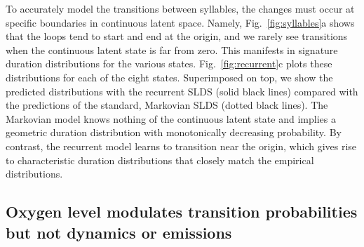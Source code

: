 \documentclass[11pt]{article}
\begin{document}
To accurately model the transitions between syllables, the changes
must occur at specific boundaries in continuous latent space.  Namely,
Fig.~\ref{fig:syllables}a shows that the loops tend to start and end
at the origin, and we rarely see transitions when the continuous
latent state is far from zero. This manifests in signature duration
distributions for the various states.  Fig.~\ref{fig:recurrent}c plots
these distributions for each of the eight states.  Superimposed on
top, we show the predicted distributions with the recurrent SLDS
(solid black lines) compared with the predictions of the standard,
Markovian SLDS (dotted black lines). The Markovian model knows nothing
of the continuous latent state and implies a geometric duration
distribution with monotonically decreasing probability. By contrast,
the recurrent model learns to transition near the origin, which gives
rise to characteristic duration distributions that closely match the
empirical distributions.


\subsection*{Oxygen level modulates transition probabilities but not dynamics or emissions}
\end{document}

